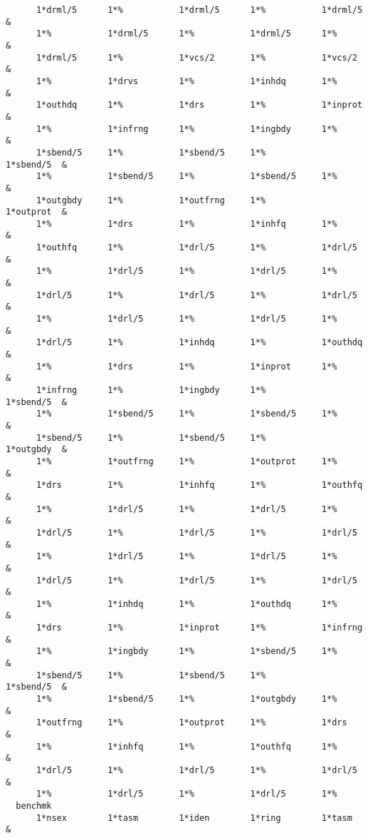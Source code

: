 \begin{footnotesize}
\begin{verbatim}
      1*drml/5      1*%           1*drml/5      1*%           1*drml/5   &
      1*%           1*drml/5      1*%           1*drml/5      1*%        &
      1*drml/5      1*%           1*vcs/2       1*%           1*vcs/2    &
      1*%           1*drvs        1*%           1*inhdq       1*%        &
      1*outhdq      1*%           1*drs         1*%           1*inprot   &
      1*%           1*infrng      1*%           1*ingbdy      1*%        &
      1*sbend/5     1*%           1*sbend/5     1*%           1*sbend/5  &
      1*%           1*sbend/5     1*%           1*sbend/5     1*%        &
      1*outgbdy     1*%           1*outfrng     1*%           1*outprot  &
      1*%           1*drs         1*%           1*inhfq       1*%        &
      1*outhfq      1*%           1*drl/5       1*%           1*drl/5    &
      1*%           1*drl/5       1*%           1*drl/5       1*%        &
      1*drl/5       1*%           1*drl/5       1*%           1*drl/5    &
      1*%           1*drl/5       1*%           1*drl/5       1*%        &
      1*drl/5       1*%           1*inhdq       1*%           1*outhdq   &
      1*%           1*drs         1*%           1*inprot      1*%        &
      1*infrng      1*%           1*ingbdy      1*%           1*sbend/5  &
      1*%           1*sbend/5     1*%           1*sbend/5     1*%        &
      1*sbend/5     1*%           1*sbend/5     1*%           1*outgbdy  &
      1*%           1*outfrng     1*%           1*outprot     1*%        &
      1*drs         1*%           1*inhfq       1*%           1*outhfq   &
      1*%           1*drl/5       1*%           1*drl/5       1*%        &
      1*drl/5       1*%           1*drl/5       1*%           1*drl/5    &
      1*%           1*drl/5       1*%           1*drl/5       1*%        &
      1*drl/5       1*%           1*drl/5       1*%           1*drl/5    &
      1*%           1*inhdq       1*%           1*outhdq      1*%        &
      1*drs         1*%           1*inprot      1*%           1*infrng   &
      1*%           1*ingbdy      1*%           1*sbend/5     1*%        &
      1*sbend/5     1*%           1*sbend/5     1*%           1*sbend/5  &
      1*%           1*sbend/5     1*%           1*outgbdy     1*%        &
      1*outfrng     1*%           1*outprot     1*%           1*drs      &
      1*%           1*inhfq       1*%           1*outhfq      1*%        &
      1*drl/5       1*%           1*drl/5       1*%           1*drl/5    &
      1*%           1*drl/5       1*%           1*drl/5       1*%
  benchmk
      1*nsex        1*tasm        1*iden        1*ring        1*tasm     &

\end{verbatim}
\end{footnotesize}
